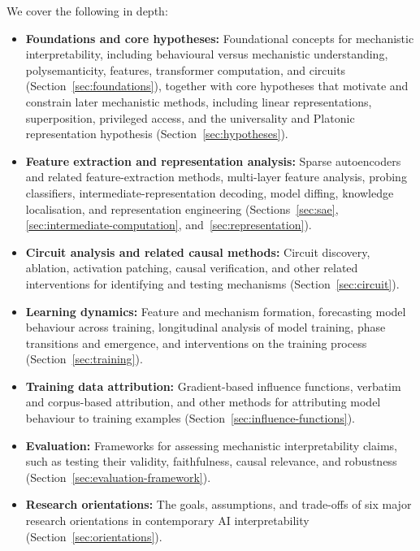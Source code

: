 We cover the following in depth:
\begin{itemize}
    \item \textbf{Foundations and core hypotheses:} Foundational concepts for mechanistic interpretability, including behavioural versus mechanistic understanding, polysemanticity, features, transformer computation, and circuits (Section~\ref{sec:foundations}), together with core hypotheses that motivate and constrain later mechanistic methods, including linear representations, superposition, privileged access, and the universality and Platonic representation hypothesis (Section~\ref{sec:hypotheses}).
    \item \textbf{Feature extraction and representation analysis:} Sparse autoencoders and related feature-extraction methods, multi-layer feature analysis, probing classifiers, intermediate-representation decoding, model diffing, knowledge localisation, and representation engineering (Sections~\ref{sec:sae}, \ref{sec:intermediate-computation}, and~\ref{sec:representation}).





    \item \textbf{Circuit analysis and related causal methods:} Circuit discovery, ablation, activation patching, causal verification, and other related interventions for identifying and testing mechanisms (Section~\ref{sec:circuit}).

    \item \textbf{Learning dynamics:} Feature and mechanism formation, forecasting model behaviour across training, longitudinal analysis of model training, phase transitions and emergence, and interventions on the training process (Section~\ref{sec:training}).

    \item \textbf{Training data attribution:} Gradient-based influence functions, verbatim and corpus-based attribution, and other methods for attributing model behaviour to training examples (Section~\ref{sec:influence-functions}).

    \item \textbf{Evaluation:} Frameworks for assessing mechanistic interpretability claims, such as testing their validity, faithfulness, causal relevance, and robustness (Section~\ref{sec:evaluation-framework}).

    \item \textbf{Research orientations:} The goals, assumptions, and trade-offs of six major research orientations in contemporary AI interpretability (Section~\ref{sec:orientations}).


\end{itemize}
